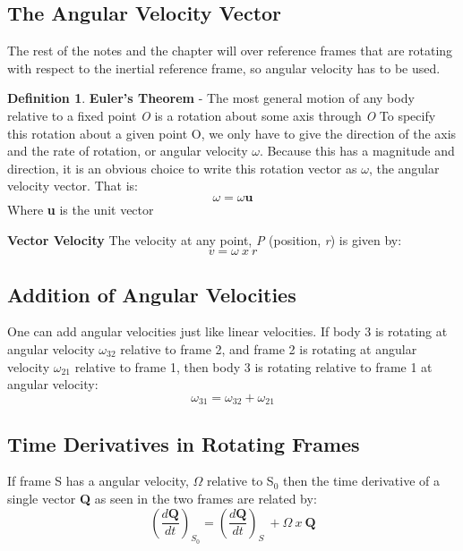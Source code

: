 \documentclass[11pt]{article}
\theoremstyle{definition}
\newtheorem{defn}{Definition}
\begin{document}
\subsection{The Angular Velocity Vector}
The rest of the notes and the chapter will over reference frames that are rotating with respect to the inertial reference frame, so angular velocity has to be used. 
\begin{defn}
\textbf{Euler's Theorem} - The most general motion of any body relative to a fixed point \textit{O} is a rotation about some axis through \textit{O} To specify this rotation about a given point O, we only have to give the direction of the axis and the rate of rotation, or angular velocity $\omega$. Because this has a magnitude and direction, it is an obvious choice to write this rotation vector as $\omega$, the angular velocity vector. That is:
\begin{equation}
\omega = \omega\textbf{u}
\end{equation}
Where \textbf{u} is the unit vector
\end{defn}
\begin{shaded}
\textbf{Vector Velocity}\newline
The velocity at any point, \textit{P} (position, \textit{r}) is given by:
\begin{equation}
v = \omega\  x \ r
\end{equation}
\end{shaded}
\subsection*{Addition of Angular Velocities}
One can add angular velocities just like linear velocities. If body 3 is rotating at angular velocity $\omega_{32}$ relative to frame 2, and frame 2 is rotating at angular velocity $\omega_{21}$ relative to frame 1, then body 3 is rotating relative to frame 1 at angular velocity: 
\begin{equation}
\omega_{31} = \omega_{32} + \omega_{21}
\end{equation}
\subsection{Time Derivatives in Rotating Frames}
If frame S has a angular velocity, $\Omega$ relative to S$_0$ then the time derivative of a single vector \textbf{Q} as seen in the two frames are related by:
\begin{equation}
(\frac{d\textbf{Q}}{dt})_{S_0} = (\frac{d\textbf{Q}}{dt})_{S} \ + \Omega \ x \ \textbf{Q}
\end{equation}
\end{document}
